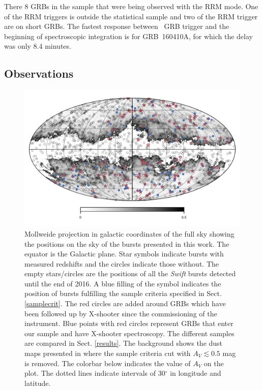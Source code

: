 \documentclass{aa}    %
\begin{document}
There 8 GRBs in the sample that were being observed with the RRM mode. One of
the RRM triggers is outside the statistical sample and two of the RRM trigger
are on short GRBs. The fastest response between \swift~GRB trigger and the
beginning of spectroscopic integration is for GRB~160410A, for which the delay
was only 8.4 minutes.


\subsection{Observations} \label{obs}


\begin{figure}
	\centerline{\includegraphics{figures/skymap.pdf}} \caption{Mollweide projection
	in galactic coordinates of the full sky showing the positions on the sky of the
	bursts presented in this work. The equator is the Galactic plane. Star symbols
	indicate bursts with measured redshifts and the circles indicate those without.
	The empty stars/circles are the positions of all the \textit{Swift} bursts
	detected until the end of 2016. A blue filling of the symbol indicates the
	position of bursts fulfilling the sample criteria specified in Sect.
	\ref{samplecrit}. The red circles are added around GRBs which have been
	followed up by X-shooter since the commissioning of the instrument. Blue points
	with red circles represent GRBs that enter our sample and have X-shooter
	spectroscopy. The different samples are compared in Sect. \ref{results}. The
	background shows the dust maps presented in \citet{Schlegel1998} where the
	sample criteria cut with $A_V \lesssim 0.5$ mag is removed. The colorbar below
	indicates the value of $A_V$ on the plot. The dotted lines indicate intervals
	of 30$^\circ$ in longitude and latitude.} \label{fig:skymap}
\end{figure}
\end{document}
